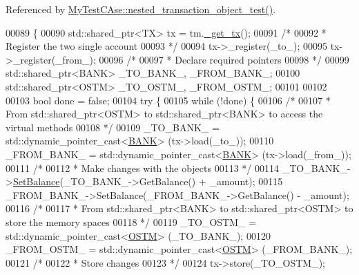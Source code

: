 Referenced by \hyperlink{_my_test_c_ase_8cpp_source_l00787}{My\+Test\+C\+Ase\+::nested\+\_\+transaction\+\_\+object\+\_\+test()}.


\begin{DoxyCode}
00089                                                                                              \{
00090     std::shared\_ptr<TX> tx = tm.\hyperlink{class_t_m_a41cb0226cc4080c931651b13f74a0075_a41cb0226cc4080c931651b13f74a0075}{\_get\_tx}();
00091     \textcolor{comment}{/*}
00092 \textcolor{comment}{     * Register the two single account}
00093 \textcolor{comment}{     */}
00094     tx->\_register(\_to\_);
00095     tx->\_register(\_from\_);
00096     \textcolor{comment}{/*}
00097 \textcolor{comment}{     * Declare required pointers }
00098 \textcolor{comment}{     */}
00099     std::shared\_ptr<BANK> \_TO\_BANK\_, \_FROM\_BANK\_;
00100     std::shared\_ptr<OSTM> \_TO\_OSTM\_, \_FROM\_OSTM\_;
00101 
00102 
00103     \textcolor{keywordtype}{bool} done = \textcolor{keyword}{false};
00104     \textcolor{keywordflow}{try} \{
00105         \textcolor{keywordflow}{while} (!done) \{
00106             \textcolor{comment}{/*}
00107 \textcolor{comment}{             * From std::shared\_ptr<OSTM> to std::shared\_ptr<BANK> to access the virtual methods}
00108 \textcolor{comment}{             */}
00109             \_TO\_BANK\_ = std::dynamic\_pointer\_cast<\hyperlink{class_b_a_n_k}{BANK}> (tx->load(\_to\_));
00110             \_FROM\_BANK\_ = std::dynamic\_pointer\_cast<\hyperlink{class_b_a_n_k}{BANK}> (tx->load(\_from\_));
00111             \textcolor{comment}{/*}
00112 \textcolor{comment}{             * Make changes with the objects}
00113 \textcolor{comment}{             */}
00114             \_TO\_BANK\_->\hyperlink{class_b_a_n_k_ae3e45b407bf8ec7175662442ea24b7c0_ae3e45b407bf8ec7175662442ea24b7c0}{SetBalance}(\_TO\_BANK\_->GetBalance() + \_amount);
00115             \_FROM\_BANK\_->SetBalance(\_FROM\_BANK\_->GetBalance() - \_amount);
00116             \textcolor{comment}{/*}
00117 \textcolor{comment}{             * From std::shared\_ptr<BANK> to std::shared\_ptr<OSTM> to store the memory spaces}
00118 \textcolor{comment}{             */}
00119             \_TO\_OSTM\_ = std::dynamic\_pointer\_cast<\hyperlink{class_o_s_t_m}{OSTM}> (\_TO\_BANK\_);
00120             \_FROM\_OSTM\_ = std::dynamic\_pointer\_cast<\hyperlink{class_o_s_t_m}{OSTM}> (\_FROM\_BANK\_);
00121             \textcolor{comment}{/*}
00122 \textcolor{comment}{             * Store changes}
00123 \textcolor{comment}{             */}
00124             tx->store(\_TO\_OSTM\_);

\end{DoxyCode}
